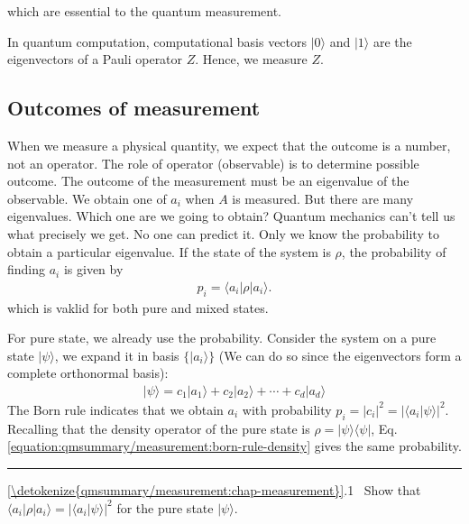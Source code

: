 \documentclass[letterpaper,10pt,english]{jupyterBook}
\begin{document}
\sphinxAtStartPar
which are essential to the quantum measurement.

\sphinxAtStartPar
In quantum computation,  computational basis vectors \(|0\rangle\) and \(|1\rangle\) are the eigenvectors of a Pauli operator \(Z\).  Hence, we measure \(Z\).


\subsection{Outcomes of measurement}
\label{\detokenize{qmsummary/measurement:outcomes-of-measurement}}
\sphinxAtStartPar
When we measure a physical quantity, we expect that the outcome is a number, not an operator.  The role of operator (observable) is to determine possible outcome.  The outcome of the measurement must be an eigenvalue of the observable.  We obtain one of \(a_i\) when \(A\) is measured.  But there are many eigenvalues.  Which one are we going to obtain?   Quantum mechanics can’t tell us what precisely we get.  No one can predict it. Only we know the probability to obtain a particular eigenvalue.   If the state of the system is \(\rho\), the probability of finding \(a_i\) is given by
\begin{equation}\label{equation:qmsummary/measurement:born-rule-density}
\begin{split}
p_i = \langle a_i| \rho |a_i\rangle.
\end{split}
\end{equation}
\sphinxAtStartPar
which is vaklid for both pure and mixed states.

\sphinxAtStartPar
For pure state, we already use the probability.  Consider the system on a pure state \(|\psi\rangle\), we expand it in basis \(\{|a_i\rangle\}\) (We can do so since the eigenvectors form a complete orthonormal basis):
\begin{equation*}
\begin{split}
|\psi\rangle = c_1 |a_1\rangle + c_2 |a_2\rangle + \cdots + c_d |a_d\rangle
\end{split}
\end{equation*}
\sphinxAtStartPar
The Born rule indicates that we obtain \(a_i\)  with probability \(p_i= |c_i|^2 = |\langle a_i | \psi \rangle |^2\).  Recalling that the density operator of  the pure state is \(\rho = |\psi\rangle\langle\psi|\), Eq. \eqref{equation:qmsummary/measurement:born-rule-density} gives the same probability.


\bigskip\hrule\bigskip


\sphinxAtStartPar
{}  \hyperref[\detokenize{qmsummary/measurement:chap-measurement}]{\ref{\detokenize{qmsummary/measurement:chap-measurement}}}.1   Show that \(\langle a_i| \rho |a_i\rangle =  |\langle a_i | \psi \rangle |^2\) for the pure state \(|\psi\rangle\).
\end{document}

